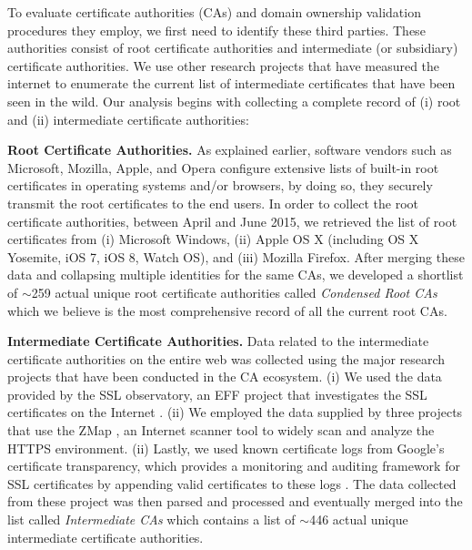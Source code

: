 To evaluate certificate authorities (CAs) and domain ownership validation procedures they employ, we first need to identify these third parties. These authorities consist of root certificate authorities and intermediate (or subsidiary) certificate authorities. We use other research projects that have measured the internet to enumerate the current list of intermediate certificates that have been seen in the wild. Our analysis begins with collecting a complete record of (i) root and (ii) intermediate certificate authorities:

\noindent\textbf{Root Certificate Authorities.} As explained earlier, software vendors such as Microsoft, Mozilla, Apple, and Opera configure extensive lists of built-in root certificates in operating systems and/or browsers, by doing so, they securely transmit the root certificates to the end users. In order to collect the root certificate authorities, between April and June 2015, we retrieved the list of root certificates from (i) Microsoft Windows, (ii) Apple OS X (including OS X Yosemite, iOS 7, iOS 8, Watch OS), and (iii) Mozilla Firefox. After merging these data and collapsing multiple identities for the same CAs, we developed a shortlist of ${\sim}$259 actual unique root certificate authorities called \emph{Condensed Root CAs} which we believe is the most comprehensive record of all the current root CAs. 

\noindent\textbf{Intermediate Certificate Authorities.} Data related to the intermediate certificate authorities on the entire web was collected using the major research projects that have been conducted in the CA ecosystem. (i) We used the data provided by the SSL observatory, an EFF project that investigates the SSL certificates on the Internet \cite{eckersley2010observatory}. (ii) We employed the data supplied by three projects \cite{durumeric2013analysis}\cite{SSLCerti90:online}\cite{MoreSSLC62:online} that use the ZMap \cite{haldermanfast}, an Internet scanner tool to widely scan and analyze the HTTPS environment. (ii) Lastly, we used known certificate logs from Google's certificate transparency, which provides a monitoring and auditing framework for SSL certificates by appending valid certificates to these logs \cite{laurie2013certificate}. The data collected from these project was then parsed and processed and eventually merged into the list called \textit{Intermediate CAs} which contains a list of ${\sim}$446 actual unique intermediate certificate authorities.

